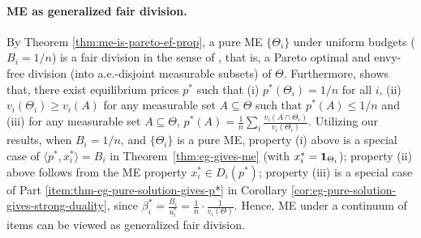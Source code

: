 \paragraph{ME as generalized fair division.}
By Theorem \ref{thm:me-is-pareto-ef-prop}, a pure ME $\{\Theta_i\}$ under uniform budgets ($B_i = 1/n$) is a fair division in the sense of \citet{weller1985fair}, that is, a Pareto optimal and envy-free division (into a.e.-disjoint measurable subsets) of $\Theta$. 
Furthermore, \citep[\S 3]{weller1985fair} shows that, there exist equilibrium prices $p^*$ such that 
(i) $p^*(\Theta_i) = 1/n$ for all $i$, 
(ii) $v_i(\Theta_i) \geq v_i(A)$ for any measurable set $A \subseteq \Theta$ such that $p^*(A) \leq 1/n$ and
(iii) for any measurable set $A\subseteq \Theta$, $p^*(A) = \frac{1}{n}\sum_i \frac{v_i(A\cap \Theta_i)}{v_i(\Theta_i)}$.
Utilizing our results, when $B_i = 1/n$, and $\{\Theta_i\}$ is a pure ME, property (i) above is a special case of $\langle p^*, x^*_i \rangle = B_i$ in Theorem~\ref{thm:eg-gives-me} (with $x^*_i = \mathbf{1}_{\Theta_i}$); property (ii) above follows from the ME property $x^*_i \in D_i(p^*)$; property (iii) is a special case of Part \ref{item:thm-eg-pure-solution-gives-p*} in Corollary \ref{cor:eg-pure-solution-gives-strong-duality}, since $\beta^*_i = \frac{B_i}{u^*_i} = \frac{1}{n} \cdot \frac{1}{v_i(\Theta)}$. Hence, ME under a continuum of items can be viewed as generalized fair division.


		
